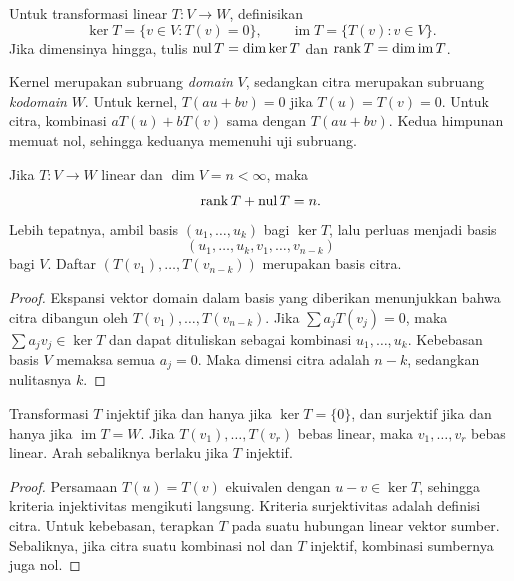 \begin{definisi}
    Untuk transformasi linear $T:V\to W$, definisikan
    \[
        \ker T=\{v\in V:T(v)=0\},\qquad
        \operatorname{im}T=\{T(v):v\in V\}.
    \]
    Jika dimensinya hingga, tulis
    $\operatorname{nul} T=\dim\ker T$ dan $\operatorname{rank} T=\dim\operatorname{im}T$.
\end{definisi}

Kernel merupakan subruang \emph{domain} $V$, sedangkan citra
merupakan subruang \emph{kodomain} $W$.
Untuk kernel, $T(au+bv)=0$ jika $T(u)=T(v)=0$.
Untuk citra, kombinasi $aT(u)+bT(v)$ sama dengan $T(au+bv)$.
Kedua himpunan memuat nol, sehingga keduanya memenuhi uji subruang.

\begin{teorema}
    Jika $T:V\to W$ linear dan $\dim V=n<\infty$, maka
    \[
        \operatorname{rank} T+\operatorname{nul} T=n.
    \]
    Lebih tepatnya, ambil basis $(u_1,\ldots,u_k)$ bagi $\ker T$,
    lalu perluas menjadi basis
    \[
        (u_1,\ldots,u_k,v_1,\ldots,v_{n-k})
    \]
    bagi $V$. Daftar $(T(v_1),\ldots,T(v_{n-k}))$ merupakan basis citra.
\end{teorema}
\begin{proof}
    Ekspansi vektor domain dalam basis yang diberikan menunjukkan
    bahwa citra dibangun oleh $T(v_1),\ldots,T(v_{n-k})$.
    Jika $\sum a_jT(v_j)=0$, maka $\sum a_jv_j\in\ker T$
    dan dapat dituliskan sebagai kombinasi $u_1,\ldots,u_k$.
    Kebebasan basis $V$ memaksa semua $a_j=0$.
    Maka dimensi citra adalah $n-k$, sedangkan nulitasnya $k$.
\end{proof}

\begin{prop}
    Transformasi $T$ injektif jika dan hanya jika $\ker T=\{0\}$,
    dan surjektif jika dan hanya jika $\operatorname{im}T=W$.
    Jika $T(v_1),\ldots,T(v_r)$ bebas linear, maka $v_1,\ldots,v_r$
    bebas linear. Arah sebaliknya berlaku jika $T$ injektif.
\end{prop}
\begin{proof}
    Persamaan $T(u)=T(v)$ ekuivalen dengan $u-v\in\ker T$,
    sehingga kriteria injektivitas mengikuti langsung.
    Kriteria surjektivitas adalah definisi citra.
    Untuk kebebasan, terapkan $T$ pada suatu hubungan linear
    vektor sumber. Sebaliknya, jika citra suatu kombinasi nol
    dan $T$ injektif, kombinasi sumbernya juga nol.
\end{proof}

